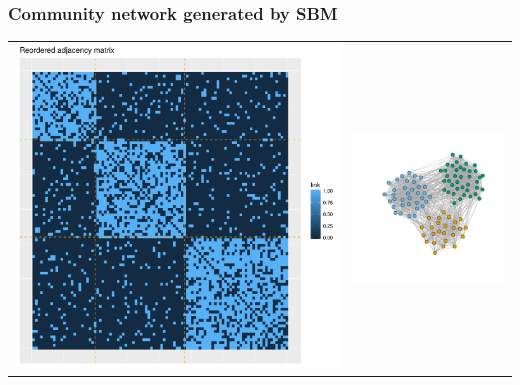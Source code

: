 \documentclass[compress,10pt]{beamer}
\begin{document}
\begin{frame}
\frametitle{Community network  generated by SBM}

\centering
\begin{tabular}{cc}
 \includegraphics[scale=.2]{plots/sbm/Affiliation_reordered_adja_with_groups.png}&
\includegraphics[scale=.2]{plots/sbm/Affiliation_graphe_with_colors.png} 
 \end{tabular}


\end{frame}
\end{document}
